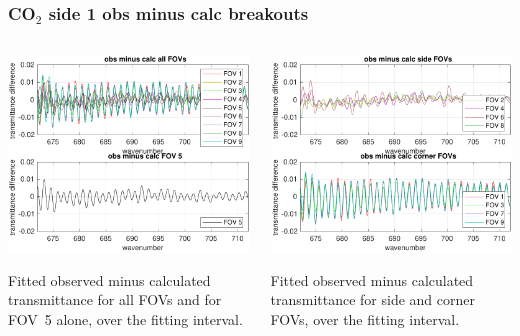 \documentclass[9pt]{beamer}
\begin{document}
\begin{frame}
\frametitle{CO$_2$ side 1 obs minus calc breakouts}
\begin{columns}[t]
\begin{column}{0.5\textwidth}
  \begin{centering}
  \includegraphics[width=\textwidth]{02-11_mn_s1_CO2/CO2_breakout_1.pdf}
  \end{centering}\vspace{3mm}

Fitted observed minus calculated transmittance for all FOVs and for FOV~5
alone, over the fitting interval.

\end{column}
\begin{column}{0.5\textwidth}  
  \begin{centering}
  \includegraphics[width=\textwidth]{02-11_mn_s1_CO2/CO2_breakout_2.pdf}
  \end{centering}\vspace{3mm}

Fitted observed minus calculated transmittance for side and corner FOVs,
over the fitting interval.

\end{column}
\end{columns}
\end{frame}
\end{document}
